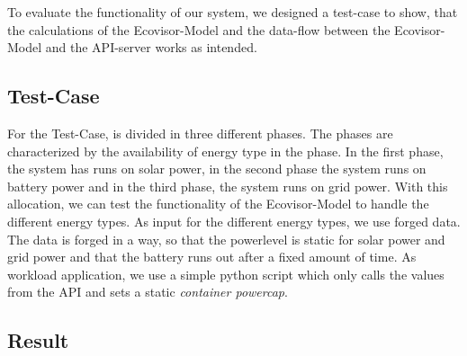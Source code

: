 To evaluate the functionality of our system, we designed a test-case to show, that the calculations of the Ecovisor-Model and the data-flow between the Ecovisor-Model and the API-server works as intended.

\subsection{Test-Case}
For the Test-Case, is divided in three different phases. The phases are characterized by the availability of energy type in the phase. In the first phase, the system has runs on solar power, in the second phase the system runs on battery power and in the third phase, the system runs on grid power. With this allocation, we can test the functionality of the Ecovisor-Model to handle the different energy types. As input for the different energy types, we use forged data. The data is forged in a way, so that the powerlevel is static for solar power and grid power and that the battery runs out after a fixed amount of time. As workload application, we use a simple python script which only calls the values from the API and sets a static \textit{container powercap}.

\subsection{Result}
